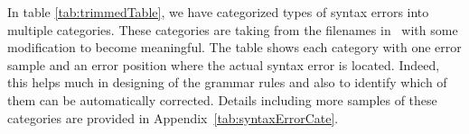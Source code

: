 In table \ref{tab:trimmedTable}, we have categorized types of syntax errors into multiple categories. These categories are taking from the filenames in~\cite{TurtleTests:Online} with some modification to become meaningful. The table shows each category with one error sample and an error position where the actual syntax error is located. Indeed, this helps much in designing of the grammar rules and also to identify which of them can be automatically corrected. Details including more samples of these categories are provided in Appendix~\ref{tab:syntaxErrorCate}.     
